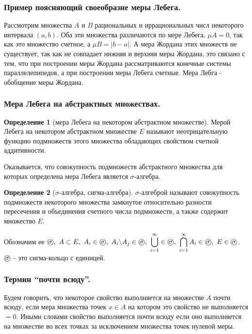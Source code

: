\documentclass[14pt,a4paper]{extarticle}
\theoremstyle{definition}
\newtheorem{definition}{Определение}[section]
\theoremstyle{remark}
\renewcommand{\[}{\begin{dmath*}[compact]}
\renewcommand{\]}{\end{dmath*}}
\newcommand{\ds}{\displaystyle}
\newcommand{\sep}{ , \ \allowbreak }
\newcommand{\sigmalgebra}{\text{\textcircled{$\sigma$}}}
\begin{document}
\subsubsection{Пример поясняющий своеобразне меры Лебега.}

Рассмотрим множества $A$ и $B$ рациональных и иррациональных числ
некоторого интервала $(a,b)$.
Оба эти множества различаются по мере Лебега.
$\mu A = 0$, так как это множество счетное, а $\mu B = |b-a|$.
А мера Жордана этих множеств не существует, так как не совпадает
нижняя и верхняя меры Жордана, это связано с тем, что при построении
меры Жордана рассматриваются конечные системы параллелепипедов,
а при построении меры Лебега счетные. Мера Лебга - обобщение меры Жордана.

\subsubsection{Мера Лебега на абстрактных множествах.}

\begin{definition}[мера Лебега на некотором абстрактном множестве]
  Мерой Лебега на некотором абстрактном множестве $E$ называют
  неотрицательную функцию подмножеств этого множества обладающих
  свойством счетной аддитивности.
\end{definition}

Оказывается, что совокупность подмножеств абстрактного множества для которых
определена мера Лебега является $\sigma$-алгебра.

\begin{definition}[$\sigma$-алгебра, сигма-алгебра]
  $\sigma$-алгеброй называют совокупность подмножеств некоторого
  множества замкнутое относительно разности пересечения и объединения
  счетного числа подмножеств, а также содержит множество $E$.
\end{definition}

Обозначим ее $\ds \sigmalgebra \sep A \subset E \sep A_i \in \sigmalgebra \sep
{A_i \backslash A_j \in \sigmalgebra} \sep
\bigcup _ {i=1}^\infty \in \sigmalgebra \sep
\bigcap _ {i=1}^\infty A_i \in \sigmalgebra \sep {E \in \sigmalgebra}$.
$\sigmalgebra$ - это сигма-кольцо с единицей.

\subsubsection{Термин ``почти всюду''.}

Будем говорить, что некоторое свойство выполняется на множестве $A$ почти всюду,
если мера множества точек $x \in A$ на котором это свойство не выполняется $=0$.
Иными словами свойство выполняется почти всюду если оно выполняется
на множестве во всех точках за исключением множества точек нулевой меры.
\end{document}

